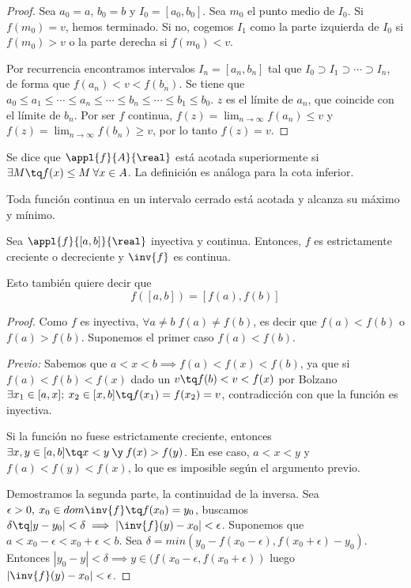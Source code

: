 \documentclass[palatino, nochap]{apuntes}
\begin{document}
\begin{proof}
Sea $a_0=a$, $b_0=b$ y $I_0=[a_0, b_0]$. Sea $m_0$ el punto medio de $I_0$. Si $f(m_0)=v$, hemos terminado. Si no, cogemos $I_1$ como la parte izquierda de $I_0$ si $f(m_0) >v$ o la parte derecha si $f(m_0)<v$.

Por recurrencia encontramos intervalos $I_n=[a_n, b_n]$ tal que $I_0\supset I_1 \supset \cdots \supset I_n$, de forma que $f(a_n)<v<f(b_n)$. Se tiene que $a_0 \leq a_1 \leq \cdots \leq a_n \leq \cdots \leq b_n \leq \cdots \leq b_1 \leq b_0$. $z$ es el límite de $a_n$, que coincide con el límite de $b_n$. Por ser $f$ continua, $f(z)=\lim_{n\to\infty}f(a_n) \leq v$ y $f(z)=\lim_{n\to\infty}f(b_n) \geq v$, por lo tanto $f(z)=v$.
\end{proof}

\begin{defn}
Se dice que $\appl{f}{A}{\real}$ está acotada superiormente si $\exists M \tq f(x)\leq M \: \forall x\in A$. La definición es análoga para la cota inferior.
\end{defn}

\begin{theorem}
\label{thmWeierstrass}
Toda función continua en un intervalo cerrado está acotada y alcanza su máximo y mínimo.
\end{theorem}

\begin{theorem}
Sea $\appl{f}{[a,b]}{\real}$ inyectiva y continua. Entonces, $f$ es estrictamente creciente o decreciente y $\inv{f}$ es continua.
\end{theorem}

\begin{remark}
Esto también quiere decir que\[f([a,b])=[f(a),f(b)]\]
\end{remark}

\begin{proof}
Como $f$ es inyectiva, $\forall a\neq b \; f(a)\neq f(b)$, es decir que $f(a)<f(b)$ o $f(a)>f(b)$. Suponemos el primer caso $f(a)<f(b)$.

\textit{Previo:} Sabemos que $a<x<b \implies f(a)<f(x)<f(b)$, ya que si $f(a)<f(b)<f(x)$ dado un $v\tq f(b)<v<f(x)$ por Bolzano $\exists x_1\in [a,x];\: x_2\in [x,b] \tq f(x_1)=f(x_2)=v$, contradicción con que la función es inyectiva.

Si la función no fuese estrictamente creciente, entonces $\exists x,y \in [a,b] \tq x<y \:\y\: f(x)>f(y)$. En ese caso, $a<x<y$ y $f(a)<f(y)<f(x)$, lo que es imposible según el argumento previo.

Demostramos la segunda parte, la continuidad de la inversa. Sea $\epsilon >0, \:x_0\in dom \inv{f} \tq f(x_0)=y_0$, buscamos $\delta \tq |y-y_0|<\delta \implies |\inv{f}(y)-x_0|<\epsilon$. Suponemos que $a<x_0-\epsilon < x_0+\epsilon < b$. Sea $\delta=min(y_0-f(x_0-\epsilon), f(x_0+\epsilon)-y_0)$. Entonces $|y_0-y|<\delta \implies y\in (f(x_0-\epsilon, f(x_0+\epsilon))$ luego $|\inv{f}(y)-x_0|<\epsilon$.
\end{proof}
\end{document}

